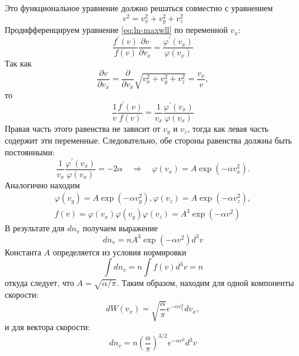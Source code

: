 Это функциональное уравнение должно решаться совместно с уравнением
\begin{equation*}
v^2=v_x^2+v_y^2+v_z^2
\end{equation*}
Продифференцируем уравнение \eqref{eq:ln-maxwll} по переменной $v_x$:
\begin{equation*}
\frac{f^{\prime}(v)}{f(v)} \frac{\partial v}{\partial v_x}=\frac{\varphi^{\prime}\left(v_x\right)}{\varphi\left(v_x\right)}
\end{equation*}
Так как
\begin{equation*}
\frac{\partial v}{\partial v_x}=\frac{\partial}{\partial v_x} \sqrt{v_x^2+v_y^2+v_z^2}=\frac{v_x}{v},
\end{equation*}
то
\begin{equation*}
\frac{1}{v} \frac{f^{\prime}(v)}{f(v)}=\frac{1}{v_x} \frac{\varphi^{\prime}\left(v_x\right)}{\varphi\left(v_x\right)}
\end{equation*}
Правая часть этого равенства не зависит от $v_y$ и $v_z$, тогда как левая часть содержит эти переменные. Следовательно, обе стороны равенства должны быть постоянными:
\begin{equation*}
	\frac{1}{v_x} \frac{\varphi^{\prime}\left(v_x\right)}{\varphi\left(v_x\right)}=-2 \alpha \quad \Rightarrow \quad \varphi\left(v_x\right)=A \exp \left(-\alpha v_x^2\right).
\end{equation*}
Аналогично находим
\begin{gather*}
\varphi\left(v_y\right)=A \exp \left(-\alpha v_y^2\right), \varphi\left(v_z\right)=A \exp \left(-\alpha v_z^2\right), \\
f(v)=\varphi\left(v_x\right) \varphi\left(v_y\right) \varphi\left(v_z\right)=A^3 \exp \left(-\alpha v^2\right)
\end{gather*}
В результате для $d n_{\mathrm{v}}$ получаем выражение
\begin{equation*}
d n_{\mathrm{v}}=n A^3 \exp \left(-\alpha v^2\right) d^3 v
\end{equation*}
Константа $A$ определяется из условия нормировки
\begin{equation*}
\int d n_v=n \int f(v) d^3 v=n
\end{equation*}
откуда следует, что $A=\sqrt{\alpha / \pi}$.
Таким образом, находим для одной компоненты скорости:
\begin{equation*}
d W\left(v_x\right)=\sqrt{\frac{\alpha}{\pi}} e^{-\alpha v_x^2} d v_x,
\end{equation*}
и для вектора скорости:
\begin{equation*}
d n_v=n\left(\frac{\alpha}{\pi}\right)^{3 / 2} e^{-\alpha v^2} d^3 v
\end{equation*}
